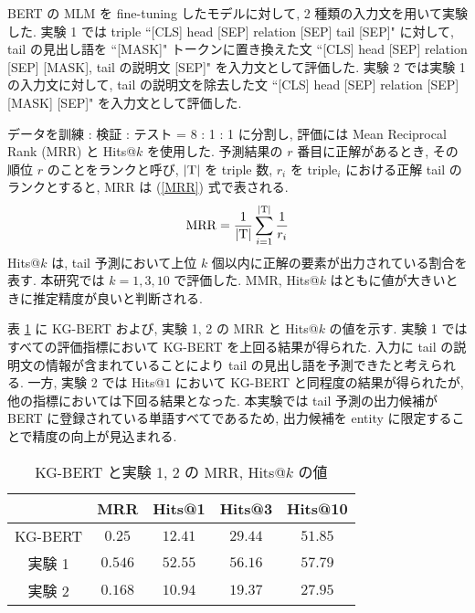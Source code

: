 \documentclass[a4paper,twoside,twocolumn,10pt]{article}
\begin{document}
BERT の MLM を fine-tuning したモデルに対して, 2 種類の入力文を用いて実験した. 実験 1 では triple ``[CLS] head [SEP] relation [SEP] tail [SEP]" に対して, tail の見出し語を ``[MASK]" トークンに置き換えた文 ``[CLS] head [SEP] relation [SEP] [MASK], tail の説明文 [SEP]" を入力文として評価した. 実験 2 では実験 1 の入力文に対して, tail の説明文を除去した文 ``[CLS] head [SEP] relation [SEP] [MASK] [SEP]" を入力文として評価した. \par
データを訓練 : 検証 : テスト = 8 : 1 : 1 に分割し, 評価には Mean Reciprocal Rank (MRR) と Hits@$k$ を使用した. 予測結果の $r$ 番目に正解があるとき, その順位 $r$ のことをランクと呼び, ${\rm |T|}$ を triple 数, $r_{i}$ を triple$_{i}$ における正解 tail のランクとすると, MRR は (\ref{MRR}) 式で表される.
\begin{equation}
    \vspace{-1mm}
    {\rm MRR} = \frac{1}{\rm |T|} \sum^{\rm |T|}_{i=1} \frac{1}{r_{i}}
    \label{MRR}
\end{equation}
Hits@$k$ は, tail 予測において上位 $k$ 個以内に正解の要素が出力されている割合を表す. 本研究では $k=1, 3, 10$ で評価した. MMR, Hits@$k$ はともに値が大きいときに推定精度が良いと判断される. \par
表 \ref{result} に KG-BERT および, 実験 1, 2 の MRR と Hits@$k$ の値を示す. 実験 1 ではすべての評価指標において KG-BERT を上回る結果が得られた. 入力に tail の説明文の情報が含まれていることにより tail の見出し語を予測できたと考えられる. 一方, 実験 2 では Hits@$1$ において KG-BERT と同程度の結果が得られたが, 他の指標においては下回る結果となった. 本実験では tail 予測の出力候補が BERT に登録されている単語すべてであるため, 出力候補を entity に限定することで精度の向上が見込まれる. \par

\begin{table}[t]
  \caption{KG-BERT と実験 1, 2 の MRR, Hits@$k$ の値}
  \label{result}
  \centering
  \setlength{\doublerulesep}{0.4pt}
  \begin{tabular}{ccccc}\hline\hline
   & MRR & Hits@1 & Hits@3 & Hits@10 \\ \hline
   KG-BERT & $0.25$ & $12.41$ & $29.44$ & $51.85$ \\ \hline
  実験 1 & $0.546$ & $52.55$ & $56.16$ & $57.79$ \\ \hline
  実験 2 & $0.168$ & $10.94$ & $19.37$ & $27.95$ \\
  \hline\hline
  \end{tabular}
  \vspace{-3mm}
\end{table}
\vspace{-1mm}
\end{document}
